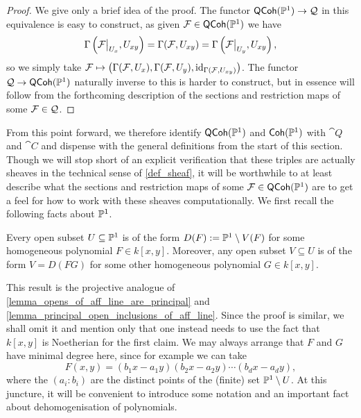 \begin{proof}
  We give only a brief idea of the proof.
  The functor $\operatorname{\mathsf{QCoh}}(\mathbb{P}^{{1}}) \to \mathcal{Q}$ in this equivalence is
  easy to construct, as given $\mathcal{F} \in \operatorname{\mathsf{QCoh}}(\mathbb{P}^{{1}})$ we have
  \[
    \displaystylesections{\setres{\shf{F}}{U_x}}{U_{xy}} =
    \sections{\shf{F}}{U_{xy}} =
    \displaystylesections{\setres{\shf{F}}{U_y}}{U_{xy}},
  \]
  so we simply take $\mathcal{F} \mapsto \left(\Gamma({\mathcal{F}}, {U_x}),
  \Gamma({\mathcal{F}}, {U_y}), \operatorname{id}_{\Gamma({\mathcal{F}}, {U_{xy}})}\right)$.
  The functor $\mathcal{Q} \to \operatorname{\mathsf{QCoh}}(\mathbb{P}^{{1}})$ naturally inverse to this
  is harder to construct, but in essence will follow from the
  forthcoming description of the sections and restriction maps of
  some $\mathcal{F} \in \mathcal{Q}$.
\end{proof}

From this point forward, we therefore identify $\operatorname{\mathsf{QCoh}}(\mathbb{P}^{{1}})$ and
$\operatorname{\mathsf{Coh}}(\mathbb{P}^{{1}})$ with $\cat{Q}$ and $\cat{C}$ and dispense with the
general definitions from the start of this section.
Though we will stop short of an explicit verification that these
triples are actually sheaves in the technical sense of
\cref{def_sheaf}, it will be worthwhile to at least describe what the
sections and restriction maps of some $\mathcal{F} \in \operatorname{\mathsf{QCoh}}(\mathbb{P}^{{1}})$
are to get a feel for how to work with these sheaves computationally.
We first recall the following facts about $\mathbb{P}^{{1}}$.

\begin{lemma}
  \label{lemma_opens_of_proj_line_are_principal}
  Every open subset $U \subseteq \mathbb{P}^{{1}}$ is of the form $D(F) :=
  \mathbb{P}^{{1}} \setminus V(F)$ for some homogeneous polynomial $F \in k[x, y]$.
  Moreover, any open subset $V \subseteq U$ is of the form $V =
  D(FG)$ for some other homogeneous polynomial $G \in k[x, y]$.
\end{lemma}


This result is the projective analogue of
\cref{lemma_opens_of_aff_line_are_principal} and
\cref{lemma_principal_open_inclusions_of_aff_line}.
Since the proof is similar, we shall omit it and mention only that
one instead needs to use the fact that $k[x, y]$ is Noetherian for
the first claim.
We may always arrange that $F$ and $G$ have minimal degree here,
since for example we can take
\[
  F(x, y) = (b_1 x - a_1 y) (b_2 x - a_2 y) \cdots (b_d x - a_d y),
\]
where the $(a_i : b_i)$ are the distinct points of the (finite) set
$\mathbb{P}^{{1}} \setminus U$.
At this juncture, it will be convenient to introduce some notation
and an important fact about dehomogenisation of polynomials.

